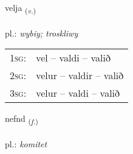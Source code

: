 \documentclass[frontgrid, backgrid]{flacards}\usepackage[]{graphicx}\usepackage[]{xcolor}
\begin{document}
\renewcommand{\flhead}{\vskip5pt \fboxsep=0pt {\small\bfseries\footnotesize Sagnorð | czasownik}}
\renewcommand{\fcfoot}{\vskip5pt \fboxsep=0pt \hspace{2pt}{\small\bfseries\footnotesize 1K}}

\renewcommand{\blhead}{\vskip5pt {\small\bfseries\footnotesize Sagnorð | czasownik }}
\renewcommand{\bcfoot}{\vskip5pt \hspace{2pt}{\small\bfseries\footnotesize 1K}}


{velja \small{\textsubscript{(\textit{v.})}} \\[1ex] %
\textphonetic{[vɛlja]} \\
pl.: \emph{wybiy; troskliwy} \\  [2ex]
\renewcommand*{\arraystretch}{0.8}
\begin{tabular}{p{1cm}l}
\textsc{1sg}: & vel -- valdi -- valið \\ 
\textsc{2sg}: & velur -- valdir -- valið \\ 
\textsc{3sg}: & velur -- valdi -- valið \\ 
\end{tabular}
}

\renewcommand{\flhead}{\vskip5pt \fboxsep=0pt {\small\bfseries\footnotesize Nafnorð | rzeczownik}}
\renewcommand{\fcfoot}{\vskip5pt \fboxsep=0pt \hspace{2pt}{\small\bfseries\footnotesize 1K}}

\renewcommand{\blhead}{\vskip5pt {\small\bfseries\footnotesize Nafnorð | rzeczownik }}
\renewcommand{\bcfoot}{\vskip5pt \hspace{2pt}{\small\bfseries\footnotesize 1K}}


{nefnd \small{\textsubscript{(\textit{f.})}} \\[1ex] %
\textphonetic{[nɛmt]} \\
pl.: \emph{komitet} \\  [2ex]
\renewcommand*{\arraystretch}{0.8}
}
\end{document}
